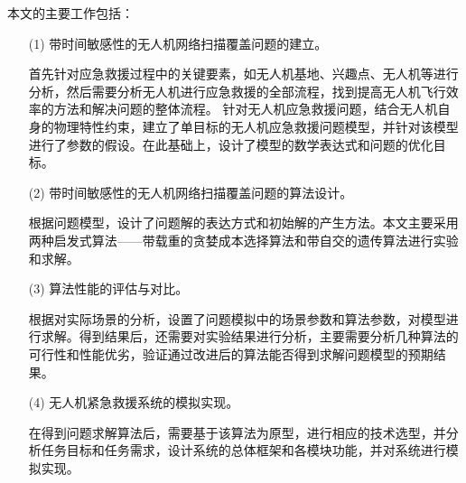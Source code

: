 本文的主要工作包括：
\begin{itemize}
  \item [(1)] 
  带时间敏感性的无人机网络扫描覆盖问题的建立。


  首先针对应急救援过程中的关键要素，如无人机基地、兴趣点、无人机等进行分析，然后需要分析无人机进行应急救援的全部流程，找到提高无人机飞行效率的方法和解决问题的整体流程。
  针对无人机应急救援问题，结合无人机自身的物理特性约束，建立了单目标的无人机应急救援问题模型，并针对该模型进行了参数的假设。在此基础上，设计了模型的数学表达式和问题的优化目标。
  \item [(2)]
  带时间敏感性的无人机网络扫描覆盖问题的算法设计。


  根据问题模型，设计了问题解的表达方式和初始解的产生方法。本文主要采用两种启发式算法——带载重的贪婪成本选择算法和带自交的遗传算法进行实验和求解。
  \item [(3)]
  算法性能的评估与对比。


  根据对实际场景的分析，设置了问题模拟中的场景参数和算法参数，对模型进行求解。得到结果后，还需要对实验结果进行分析，主要需要分析几种算法的可行性和性能优劣，验证通过改进后的算法能否得到求解问题模型的预期结果。
  \item [(4)]
  无人机紧急救援系统的模拟实现。


  在得到问题求解算法后，需要基于该算法为原型，进行相应的技术选型，并分析任务目标和任务需求，设计系统的总体框架和各模块功能，并对系统进行模拟实现。
\end{itemize}